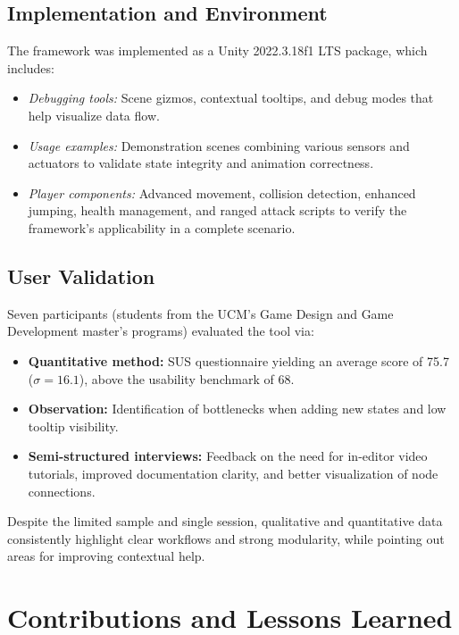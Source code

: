 \subsection*{Implementation and Environment}
The framework was implemented as a Unity 2022.3.18f1 LTS package, which includes:
\begin{itemize}
  \item \emph{Debugging tools:} Scene gizmos, contextual tooltips, and debug modes that help visualize data flow.
  \item \emph{Usage examples:} Demonstration scenes combining various sensors and actuators to validate state integrity and animation correctness.
  \item \emph{Player components:} Advanced movement, collision detection, enhanced jumping, health management, and ranged attack scripts to verify the framework’s applicability in a complete scenario.
\end{itemize}

\subsection*{User Validation}
Seven participants (students from the UCM’s Game Design and Game Development master’s programs) evaluated the tool via:
\begin{itemize}
  \item \textbf{Quantitative method:} SUS questionnaire yielding an average score of 75.7 (\(\sigma=16.1\)), above the usability benchmark of 68.
  \item \textbf{Observation:} Identification of bottlenecks when adding new states and low tooltip visibility.
  \item \textbf{Semi-structured interviews:} Feedback on the need for in-editor video tutorials, improved documentation clarity, and better visualization of node connections.
\end{itemize}
Despite the limited sample and single session, qualitative and quantitative data consistently highlight clear workflows and strong modularity, while pointing out areas for improving contextual help.

\section*{Contributions and Lessons Learned}


